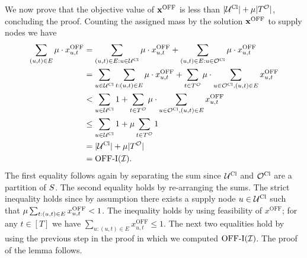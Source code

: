 {    
    We now prove that the objective value of $\mathbf{x}^{\mathrm{OFF}}$ is less than $|\mathcal U^{\mathrm{Cl}}| + \mu |T^\mathcal O|$, concluding the proof. Counting the assigned mass by the solution $\mathbf{x}^{\mathrm{OFF}}$ to supply nodes we have
    \begin{align*}
        \sum_{(u,t) \in E} \mu \cdot x^{\mathrm{OFF}}_{u,t} &= \sum_{(u,t) \in E : u \in \mathcal U^{\mathrm{Cl}}}  \mu \cdot x^{\mathrm{OFF}}_{u,t} + \sum_{(u,t) \in E : u \in \mathcal O^{\mathrm{Cl}}}  \mu \cdot x^{\mathrm{OFF}}_{u,t}\\
        &= \sum_{u \in \mathcal U^{\mathrm{Cl}}} \sum_{t: (u,t) \in E} \mu \cdot x^{\mathrm{OFF}}_{u,t} + \sum_{t \in T^\mathcal O} \mu \cdot \sum_{u \in \mathcal O^{\mathrm{Cl}}, (u,t) \in E}  x^{\mathrm{OFF}}_{u,t}\\
        &< \sum_{u \in \mathcal U^{\mathrm{Cl}}} 1 + \sum_{t \in T^\mathcal O} \mu \cdot \sum_{u \in \mathcal O^{\mathrm{Cl}}, (u,t) \in E}  x^{\mathrm{OFF}}_{u,t}\\
        &\leq \sum_{u \in \mathcal U^{\mathrm{Cl}}} 1 + \mu \sum_{t \in T^\mathcal O} 1\\
        &= |\mathcal U^{\mathrm{Cl}}| + \mu |T^\mathcal O|\\
        &= \mathrm{\mathrm{OFF}}\textrm{-}\mathrm{I}(\mathcal I).
    \end{align*}
    The first equality follows again by separating the sum since $\mathcal U^{\mathrm{Cl}}$ and $\mathcal O^{\mathrm{Cl}}$ are a partition of $S$. The second equality holds by re-arranging the sums. The strict inequality holds since by assumption there exists a supply node $u \in \mathcal U^{\mathrm{Cl}}$ such that $\mu \sum_{t: (u,t) \in E} x^{\mathrm{OFF}}_{u,t} < 1$. The inequality holds by using feasibility of $x^{\mathrm{OFF}}$; for any $t \in [T]$ we have $\sum_{u : (u,t) \in E} x^{\mathrm{OFF}}_{u,t} \leq 1$. The next two equalities hold by using the previous step in the proof in which we computed $\mathrm{\mathrm{OFF}}\textrm{-}\mathrm{I}(\mathcal I)$. The proof of the lemma follows.
    \hfill\Halmos


}
